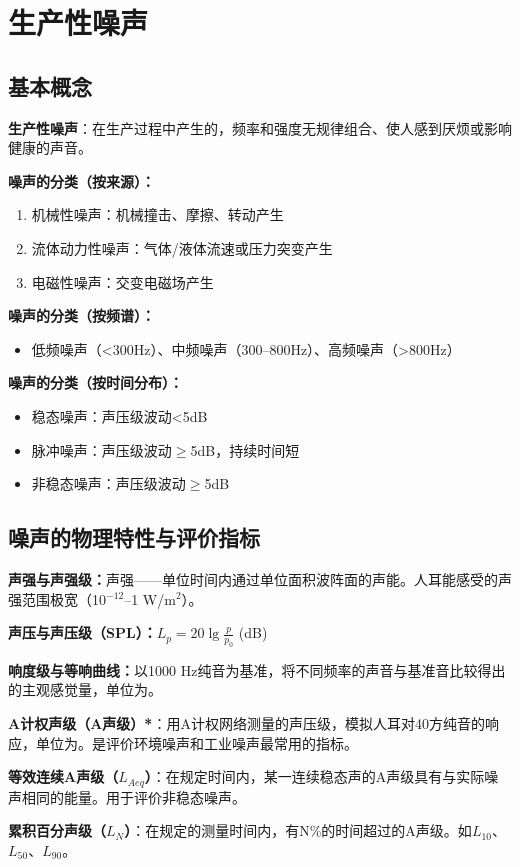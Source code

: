 \section{生产性噪声}

\subsection{基本概念}

\begin{defbox}
\textbf{生产性噪声}：在生产过程中产生的，频率和强度无规律组合、使人感到厌烦或影响健康的声音。

\textbf{噪声的分类（按来源）：}
\begin{enumerate}[leftmargin=*]
    \item 机械性噪声：机械撞击、摩擦、转动产生
    \item 流体动力性噪声：气体/液体流速或压力突变产生
    \item 电磁性噪声：交变电磁场产生
\end{enumerate}

\textbf{噪声的分类（按频谱）：}
\begin{itemize}[leftmargin=*]
    \item 低频噪声（<300Hz）、中频噪声（300--800Hz）、高频噪声（>800Hz）
\end{itemize}

\textbf{噪声的分类（按时间分布）：}
\begin{itemize}[leftmargin=*]
    \item 稳态噪声：声压级波动<5dB
    \item 脉冲噪声：声压级波动$\geq$5dB，持续时间短
    \item 非稳态噪声：声压级波动$\geq$5dB
\end{itemize}
\end{defbox}

\subsection{噪声的物理特性与评价指标}

\begin{keybox}
\textbf{声强与声强级：}声强——单位时间内通过单位面积波阵面的声能。人耳能感受的声强范围极宽（10$^{-12}$--1 W/m$^2$）。

\textbf{声压与声压级（SPL）：}$L_p = 20 \lg \frac{p}{p_0}$ (dB)

\textbf{响度级与等响曲线：}以1000 Hz纯音为基准，将不同频率的声音与基准音比较得出的主观感觉量，单位为。

\textbf{A计权声级（A声级）*}：用A计权网络测量的声压级，模拟人耳对40方纯音的响应，单位为。是评价环境噪声和工业噪声最常用的指标。

\textbf{等效连续A声级（$L_{Aeq}$）}：在规定时间内，某一连续稳态声的A声级具有与实际噪声相同的能量。用于评价非稳态噪声。

\textbf{累积百分声级（$L_N$）}：在规定的测量时间内，有N\%的时间超过的A声级。如$L_{10}$、$L_{50}$、$L_{90}$。
\end{keybox}

